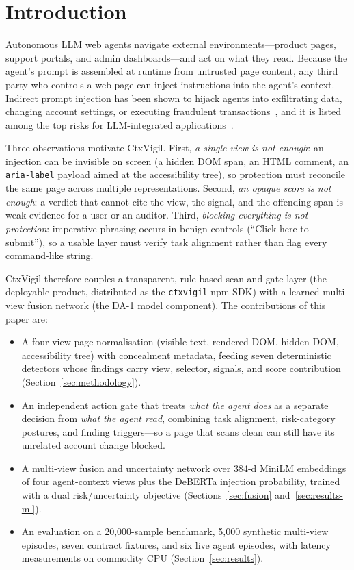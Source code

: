 \documentclass[journal]{IEEEtran}
\begin{document}
\maketitle

\section{Introduction}
Autonomous LLM web agents navigate external environments---product pages,
support portals, and admin dashboards---and act on what they read. Because the
agent's prompt is assembled at runtime from untrusted page content, any third
party who controls a web page can inject instructions into the agent's
context. Indirect prompt injection has been shown to hijack agents into
exfiltrating data, changing account settings, or executing fraudulent
transactions~\cite{greshake2023,injecagent2024,bipia2023}, and it is listed
among the top risks for LLM-integrated applications~\cite{owasp2025}.

Three observations motivate CtxVigil. First, \emph{a single view is not
enough}: an injection can be invisible on screen (a hidden DOM span, an HTML
comment, an \texttt{aria-label} payload aimed at the accessibility tree), so
protection must reconcile the same page across multiple representations.
Second, \emph{an opaque score is not enough}: a verdict that cannot cite the
view, the signal, and the offending span is weak evidence for a user or an
auditor. Third, \emph{blocking everything is not protection}: imperative
phrasing occurs in benign controls (``Click here to submit''), so a usable
layer must verify task alignment rather than flag every command-like string.

CtxVigil therefore couples a transparent, rule-based scan-and-gate layer
(the deployable product, distributed as the \texttt{ctxvigil} npm SDK) with a
learned multi-view fusion network (the DA-1 model component). The
contributions of this paper are:

\begin{itemize}
\item A four-view page normalisation (visible text, rendered DOM, hidden DOM,
accessibility tree) with concealment metadata, feeding seven deterministic
detectors whose findings carry view, selector, signals, and score
contribution (Section~\ref{sec:methodology}).
\item An independent action gate that treats \emph{what the agent does} as a
separate decision from \emph{what the agent read}, combining task alignment,
risk-category postures, and finding triggers---so a page that scans clean can
still have its unrelated account change blocked.
\item A multi-view fusion and uncertainty network over 384-d MiniLM
embeddings of four agent-context views plus the DeBERTa injection probability,
trained with a dual risk/uncertainty objective (Sections~\ref{sec:fusion}
and~\ref{sec:results-ml}).
\item An evaluation on a 20{,}000-sample benchmark, 5{,}000 synthetic
multi-view episodes, seven contract fixtures, and six live agent episodes,
with latency measurements on commodity CPU (Section~\ref{sec:results}).
\end{itemize}
\end{document}
